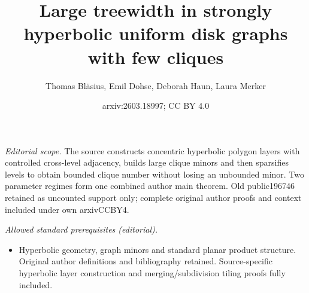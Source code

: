 \documentclass[11pt]{article}
\title{Large treewidth in strongly hyperbolic uniform disk graphs with few cliques}
\author{Thomas Bläsius, Emil Dohse, Deborah Haun, Laura Merker}
\date{arxiv:2603.18997; CC BY 4.0}
\begin{document}
\maketitle
\noindent\textit{Editorial scope.} The source constructs concentric hyperbolic polygon layers with controlled cross-level adjacency, builds large clique minors and then sparsifies levels to obtain bounded clique number without losing an unbounded minor. Two parameter regimes form one combined author main theorem. Old public196746 retained as uncounted support only; complete original author proofs and context included under own arxivCCBY4.\par\medskip
\noindent\textit{Allowed standard prerequisites (editorial).}\begin{itemize}
\item Hyperbolic geometry, graph minors and standard planar product structure. Original author definitions and bibliography retained. Source-specific hyperbolic layer construction and merging/subdivision tiling proofs fully included.
\end{itemize}\medskip
\end{document}
